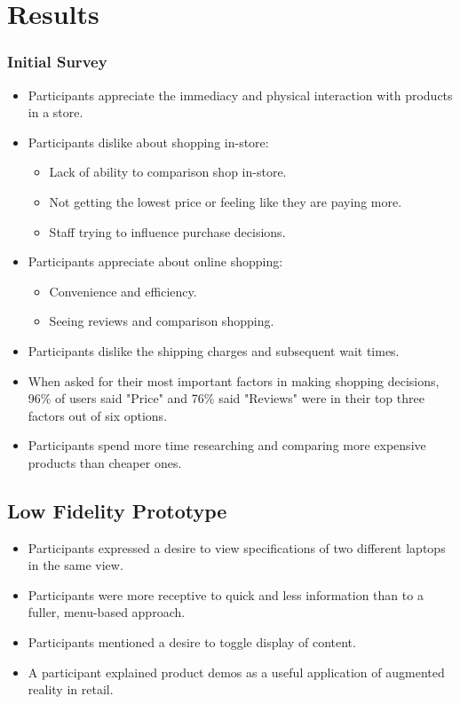 \section{Results}

\subsubsection{Initial Survey}
\begin{itemize}
\item Participants appreciate the immediacy and physical interaction with products in a store.
\item Participants dislike about shopping in-store:
	\begin{itemize} \compresslist%
		\item Lack of ability to comparison shop in-store.
		\item Not getting the lowest price or feeling like they are paying more.
		\item Staff trying to influence purchase decisions.
	\end{itemize}
\item Participants appreciate about online shopping:
	\begin {itemize} \compresslist%
		\item Convenience and efficiency.
		\item Seeing reviews and comparison shopping.
	\end{itemize}
\item Participants dislike the shipping charges and subsequent wait times.
\item When asked for their most important factors in making shopping decisions, 96\% of users said "Price" and 76\% said "Reviews" were in their top three factors out of six options.
\item Participants spend more time researching and comparing more expensive products than cheaper ones.
\end{itemize}

\subsection{Low Fidelity Prototype}
\begin{itemize}
	\item Participants expressed a desire to view specifications of two different laptops in the same view.
	\item Participants were more receptive to quick and less information than to a fuller, menu-based approach.
	\item Participants mentioned a desire to toggle display of content.
	\item A participant explained product demos as a useful application of augmented reality in retail.
\end{itemize}

